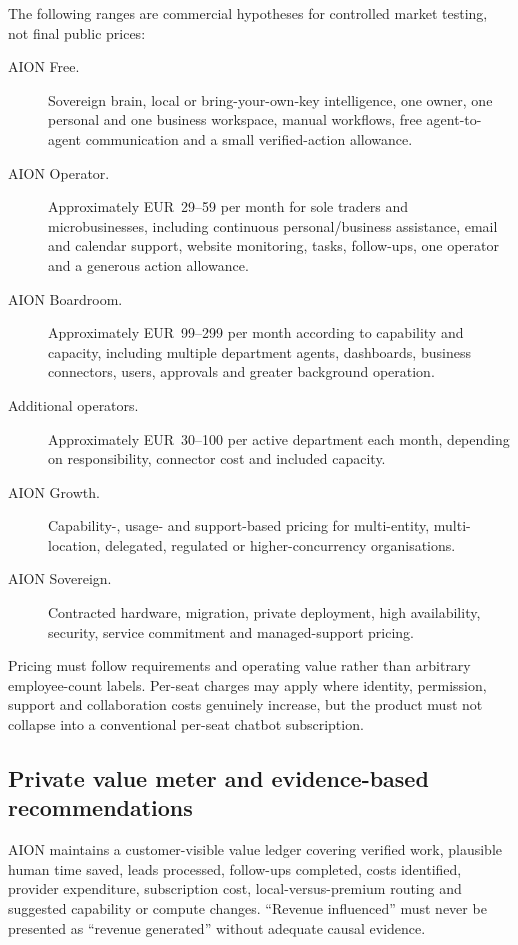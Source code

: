 The following ranges are commercial hypotheses for controlled market testing, not final public
prices:

\begin{description}
  \item[AION Free.] Sovereign brain, local or bring-your-own-key intelligence, one owner, one
        personal and one business workspace, manual workflows, free agent-to-agent communication
        and a small verified-action allowance.
  \item[AION Operator.] Approximately EUR~29--59 per month for sole traders and microbusinesses,
        including continuous personal/business assistance, email and calendar support, website
        monitoring, tasks, follow-ups, one operator and a generous action allowance.
  \item[AION Boardroom.] Approximately EUR~99--299 per month according to capability and capacity,
        including multiple department agents, dashboards, business connectors, users, approvals
        and greater background operation.
  \item[Additional operators.] Approximately EUR~30--100 per active department each month,
        depending on responsibility, connector cost and included capacity.
  \item[AION Growth.] Capability-, usage- and support-based pricing for multi-entity, multi-location,
        delegated, regulated or higher-concurrency organisations.
  \item[AION Sovereign.] Contracted hardware, migration, private deployment, high availability,
        security, service commitment and managed-support pricing.
\end{description}

Pricing must follow requirements and operating value rather than arbitrary employee-count labels.
Per-seat charges may apply where identity, permission, support and collaboration costs genuinely
increase, but the product must not collapse into a conventional per-seat chatbot subscription.

\subsection{Private value meter and evidence-based recommendations}

AION maintains a customer-visible value ledger covering verified work, plausible human time saved,
leads processed, follow-ups completed, costs identified, provider expenditure, subscription cost,
local-versus-premium routing and suggested capability or compute changes. ``Revenue influenced''
must never be presented as ``revenue generated'' without adequate causal evidence.

